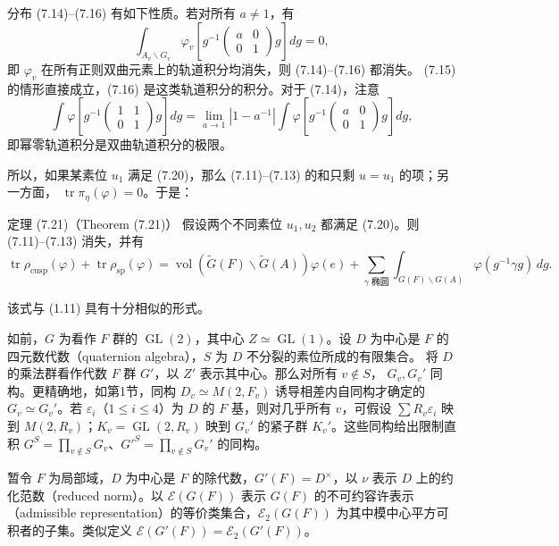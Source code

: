 分布 (7.14)--(7.16) 有如下性质。若对所有 $a\ne1$，有
\begin{equation}
 \int_{A_v\backslash G_v}\varphi_v\!\left[g^{-1}\begin{pmatrix}a&0\\0&1\end{pmatrix}g\right]dg=0,\tag{7.20}
\end{equation}
即 $\varphi_v$ 在所有正则双曲元素上的轨道积分均消失，则 (7.14)--(7.16) 都消失。
(7.15) 的情形直接成立，(7.16) 是这类轨道积分的积分。对于 (7.14)，注意
\[
 \int\varphi\!\left[g^{-1}\begin{pmatrix}1&1\\0&1\end{pmatrix}g\right]dg
 =\lim_{a\to1}|1-a^{-1}|
 \int\varphi\!\left[g^{-1}\begin{pmatrix}a&0\\0&1\end{pmatrix}g\right]dg,
\]
即幂零轨道积分是双曲轨道积分的极限。

所以，如果某素位 $u_1$ 满足 (7.20)，那么 (7.11)--(7.13) 的和只剩 $u=u_1$ 的项；另一方面，
$\operatorname{tr}\pi_\eta(\varphi)=0$。于是：
\begin{originaltheorem}{定理 (7.21)（Theorem (7.21)）}
假设两个不同素位 $u_1,u_2$ 都满足 (7.20)。则 (7.11)--(7.13) 消失，并有
\[
 \operatorname{tr}\rho_{\mathrm{cusp}}(\varphi)+\operatorname{tr}\rho_{\mathrm{sp}}(\varphi)
 =\operatorname{vol}(\widetilde G(F)\backslash\widetilde G(A))\varphi(e)
 +\sum_{\gamma\text{ 椭圆}}\int_{G(F)\backslash G(A)}\varphi(g^{-1}\gamma g)\,dg.
\]
\end{originaltheorem}
该式与 (1.11) 具有十分相似的形式。

如前，$G$ 为看作 $F$ 群的 $\operatorname{GL}(2)$，其中心 $Z\simeq\operatorname{GL}(1)$。设
$D$ 为中心是 $F$ 的四元数代数（quaternion algebra），$S$ 为 $D$ 不分裂的素位所成的有限集合。
将 $D$ 的乘法群看作代数 $F$ 群 $G'$，以 $Z'$ 表示其中心。那么对所有 $v\notin S$，
$G_v,G_v'$ 同构。更精确地，如第1节，同构 $D_v\simeq M(2,F_v)$ 诱导相差内自同构才确定的
$G_v\simeq G_v'$。若 $\varepsilon_i$（$1\le i\le4$）为 $D$ 的 $F$ 基，则对几乎所有 $v$，可假设
$\sum R_v\varepsilon_i$ 映到 $M(2,R_v)$；$K_v=\operatorname{GL}(2,R_v)$ 映到 $G_v'$ 的紧子群
$K_v'$。这些同构给出限制直积
$G^S=\prod_{v\notin S}G_v$、$G'^S=\prod_{v\notin S}G_v'$ 的同构。

暂令 $F$ 为局部域，$D$ 为中心是 $F$ 的除代数，$G'(F)=D^\times$，以 $\nu$ 表示
$D$ 上的约化范数（reduced norm）。以 $\mathcal E(G(F))$ 表示 $G(F)$ 的不可约容许表示（admissible representation）的等价类集合，$\mathcal E_2(G(F))$ 为其中模中心平方可积者的子集。类似定义
$\mathcal E(G'(F))=\mathcal E_2(G'(F))$。

